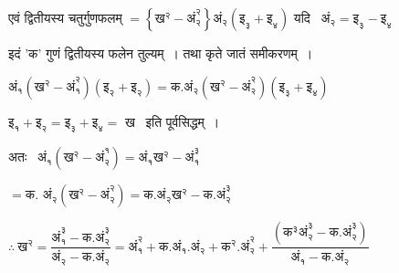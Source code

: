 \documentclass[11pt, openany]{book}
\begin{document}
{\vspace{1mm}
एवं द्वितीयस्य चतुर्गुणफलम् $= \left\{\mbox{ख}^{\text{२}} - \mbox{अं}_{\text{२}}^{\text{२}}\right\} \mbox{अं}_{\text{२}}\left(\mbox{इ}_{\text{३}}
+ \mbox{इ}_{\text{४}}\right)$ \hspace{4mm} यदि~ $\mbox{अं}_{\text{२}} = \mbox{इ}_{\text{३}} - \mbox{इ}_{\text{४}}$

\vspace{1mm}
इदं 'क' गुणं द्वितीयस्य फलेन तुल्यम्~। तथा कृते जातं समीकरणम्~। 

\vspace{1mm}
\hspace{6mm} $\mbox{अं}_{\text{१}}\left(\mbox{ख}^{\text{२}} - \mbox{अं}_{\text{१}}^{\text{२}}\right)\left( \mbox{इ}_{\text{२}} + \mbox{इ}_{\text{२}}\right) = \mbox{क.अं}_{\text{२}}\left(\mbox{ख}^{\text{२}} - \mbox{अं}_{\text{२}}^{\text{२}}\right)\left( \mbox{इ}_{\text{३}} + \mbox{इ}_{\text{४}}\right)$

\vspace{1mm}
\hspace{2mm} $\mbox{इ}_{\text{१}} + \mbox{इ}_{\text{२}}  = \mbox{इ}_{\text{३}} + \mbox{इ}_{\text{४}} =$ ख ~इति पूर्वसिद्धम्~। 

\vspace{1mm}
अतः~ $\mbox{अं}_{\text{१}}\left(\mbox{ख}^{\text{२}} - \mbox{अं}_{\text{२}}^{\text{१}}\right) = \mbox{अं}_{\text{१}}\mbox{ख}^{\text{२}} - \mbox{अं}_{\text{१}}^{\text{३}}$

\vspace{1mm}
\hspace{10mm} $= \mbox{क. अं}_{\text{२}}\left(\mbox{ख}^{\text{२}} - \mbox{अं}_{\text{२}}^{\text{२}}\right) = \mbox{क.अं}_{\text{२}}\mbox{ख}^{\text{२}} - \mbox{क.अं}_{\text{२}}^{\text{३}}$

\vspace{1mm}
$\therefore\ \mbox{ख}^{\text{२}} = \dfrac{\mbox{अं}_{\text{१}}^{\text{३}} - \mbox{क.अं}_{\text{२}}^{\text{३}}}{\mbox{अं}_{\text{२}} - \mbox{क.अं}_{\text{२}}} = \mbox{अं}_{\text{१}}^{\text{२}} + \mbox{क.अं}_{\text{१}}.\mbox{अं}_{\text{२}} + \mbox{क}^{\text{२}}.\mbox{अं}_{\text{२}}^{\text{२}} 
 + \dfrac{\left(\mbox{क}^{\text{३}}\mbox{अं}_{\text{२}}^{\text{३}} - \mbox{क.अं}_{\text{२}}^{\text{३}}\right)}{\mbox{अं}_{\text{१}} - \mbox{क.अं}_{\text{२}}}$}
\end{document}
